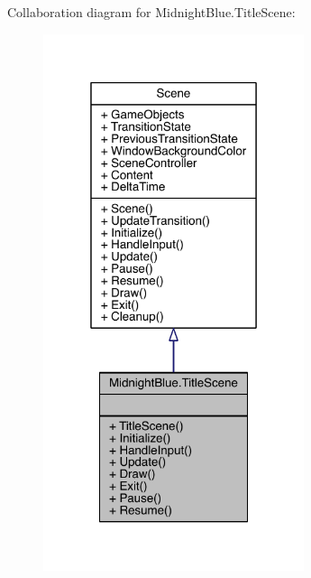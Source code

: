 Collaboration diagram for Midnight\+Blue.\+Title\+Scene\+:\nopagebreak
\begin{figure}[H]
\begin{center}
\leavevmode
\includegraphics[width=217pt]{class_midnight_blue_1_1_title_scene__coll__graph}
\end{center}
\end{figure}
